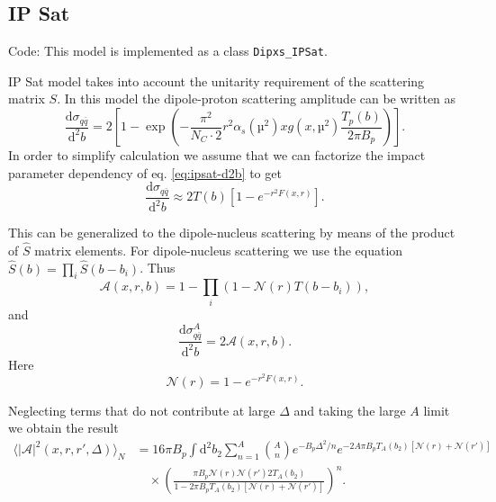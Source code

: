 \documentclass[a4paper,12pt]{article}
\newcommand{\code}[1]{\texttt{#1}}
\newcommand{\der}{\mathrm{d}}
\newcommand{\A}{\mathcal{A}}
\newcommand{\N}{\mathcal{N}}
\begin{document}
\subsection{IP Sat}
\label{ipsat}
Code: This model is implemented as a class \code{Dipxs\_IPSat}.

IP Sat model takes into account the unitarity requirement of the scattering matrix $S$. In this model the dipole-proton scattering amplitude can be written as \cite{PhysRevD.68.114005}
\begin{equation}
	\label{eq:ipsat-d2b}
	\frac{\der \sigma_{q\bar q}}{\der^2 b} = 2\left[1- \exp \left(-\frac{\pi^2}{N_C\cdot 2}r^2 \alpha_s(µ^2)xg(x,µ^2) \frac{T_p(b)}{2\pi B_p} \right) \right].
\end{equation}
In order to simplify calculation we assume that we can factorize the impact parameter dependency of eq. \eqref{eq:ipsat-d2b} to get
\begin{equation}
	\label{eq:ipsat-d2b-f}
	\frac{\der \sigma_{q\bar q}}{\der^2 b} \approx 2T(b) \left[1 - e^{-r^2F(x,r)} \right].
\end{equation}

This can be generalized to the dipole-nucleus scattering by means of the product of $\hat S$ matrix elements. For dipole-nucleus scattering we use the equation $\hat S(b) = \prod_i \hat S(b-b_i)$. Thus
\begin{equation}
	\label{eq:ipsat-a}
	\A(x,r,b) = 1 - \prod_i \left( 1-\N(r)T(b-b_i) \right),
\end{equation}
and
\begin{equation}
	\frac{\der \sigma_{q\bar q}^A}{\der^2 b} = 2\A(x,r,b).
\end{equation}
Here
\begin{equation}
	\N(r) = 1-e^{-r^2F(x,r)}.
\end{equation}

Neglecting terms that do not contribute at large $\Delta$ and taking the large $A$ limit we obtain the result
\begin{equation}
\label{eq:ipsat-asqr}
\begin{split}
	\langle |\A|^2(x,r,r',\Delta) \rangle_N &= 16\pi B_p \int \der^2 b_2 \sum_{n=1}^A \binom{A}{n} e^{-B_p \Delta^2/n} e^{-2A\pi B_p T_A(b_2)[\N(r)+\N(r')]} \\
	&\quad \times \left(\frac{\pi B_p \N(r)\N(r') 2 T_A(b_2)}{1-2\pi B_p T_A(b_2)[\N(r)+\N(r')]}\right)^n.
\end{split}
\end{equation}
\end{document}
